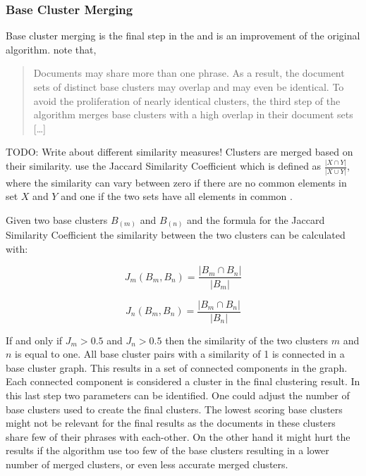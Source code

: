 \subsubsection{Base Cluster Merging}
Base cluster merging is the final step in the \STC and is an improvement of the original algorithm. \citeauthor{Oren1998} note that,
\begin{quote}
Documents may share more than one phrase. As a result, the document sets of distinct base clusters may overlap and may even be identical. To avoid the proliferation of nearly identical clusters, the third step of the algorithm merges base clusters with a high overlap in their document sets [\dots] \cite[][3]{Oren1998}
\end{quote}
TODO: Write about different similarity measures!
Clusters are merged based on their similarity. \citeauthor{Oren1998} use the Jaccard Similarity Coefficient which is defined as 
\begin{math}
\frac{\vert X \cap Y \vert} {\vert X \cup Y \vert}
\end{math},
where the similarity can vary between zero if there are no common elements in set \(X\) and \(Y\) and one if the two sets have all elements in common \cite{VanRijsbergen1979}.

Given two base clusters \(B_(m)\) and \(B_(n)\) and the formula for the Jaccard Similarity Coefficient the similarity between the two clusters can be calculated with:

\begin{displaymath} 
J_{m}(B_{m},B_{n}) = 
\frac{\vert B_{m} \cap B_{n} \vert} {\vert B_{m} \vert}
\end{displaymath}

\begin{displaymath} 
J_{n}(B_{m},B_{n}) = 
\frac{\vert B_{m} \cap B_{n} \vert} {\vert B_{n} \vert}
\end{displaymath}

If and only if \(J_{m} > 0.5\) and \(J_{n} > 0.5 \) then the similarity of the two clusters \(m\) and \(n\) is equal to one. All base cluster pairs with a similarity of 1 is connected in a base cluster graph. This results in a set of connected components in the graph. Each connected component is considered a cluster in the final clustering result. In this last step two parameters can be identified. One could adjust the number of base clusters used to create the final clusters. The lowest scoring base clusters might not be relevant for the final results as the documents in these clusters share few of their phrases with each-other. On the other hand it might hurt the results if the algorithm use too few of the base clusters resulting in a lower number of merged clusters, or even less accurate merged clusters.

